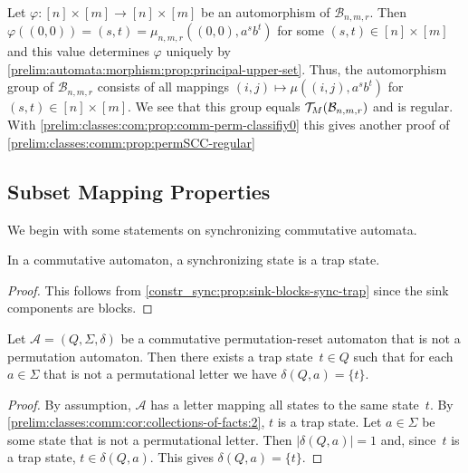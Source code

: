 \begin{remark} \label{prelim:classes:com:rem:comm-perm-classify}
	Let $\varphi \colon [n] \times [m] \to [n] \times [m]$
	be an automorphism of $\mathcal B_{n,m,r}$.
	Then $\varphi((0,0)) = (s,t) = \mu_{n,m,r}((0,0), a^sb^t)$
	for some $(s,t) \in [n] \times [m]$
	and this value determines $\varphi$ uniquely
	by \cref{prelim:automata:morphism:prop:principal-upper-set}.
	Thus, the automorphism group of $\mathcal B_{n,m,r}$
	consists of all mappings $(i,j) \mapsto \mu((i,j), a^s b^t)$
	for $(s,t) \in [n] \times [m]$.
	We see that this group equals $\mathcal T_M(\mathcal B_{n,m,r})$
	and is regular.
	With \cref{prelim:classes:com:prop:comm-perm-classifiy0} this gives another proof of
	\cref{prelim:classes:comm:prop:permSCC-regular} 
\end{remark}

\subsection{Subset Mapping Properties}
\label{prelim:classes:comm:subsec:subset}

We begin with some statements on synchronizing commutative automata.

\begin{proposition} \label{prelim:classes:comm:cor:collections-of-facts:2}
 In a commutative automaton, a synchronizing state is a trap state.
\end{proposition} 
\begin{proof}
	This follows from \cref{constr_sync:prop:sink-blocks-sync-trap} since the sink components are blocks.	
\end{proof}

\begin{corollary} \label{prelim:classes:comm:cor:sync-trap}
	Let $\mathcal A = (Q, \Sigma, \delta)$ be a commutative permutation-reset automaton
	that is not a permutation automaton.
	Then there exists a trap state~$t \in Q$
	such that for each $a \in \Sigma$ that is not a permutational letter
	we have $\delta(Q, a) = \{t\}$.	
\end{corollary}
\begin{proof}
	By assumption, $\mathcal A$ has a letter mapping all states
	to the same state~$t$.
	By \cref{prelim:classes:comm:cor:collections-of-facts:2}, $t$ is a trap state.
	Let $a \in \Sigma$ be some state that is not a permutational letter.
	Then $|\delta(Q, a)| = 1$ and, since~$t$ is a trap state,
	$t \in \delta(Q, a)$. This gives $\delta(Q, a) = \{t\}$.
\end{proof}

